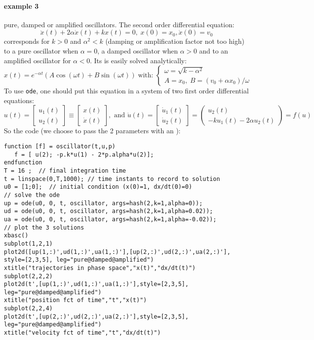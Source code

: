 \begin{examples}
\paragraph{example 3} pure, damped or amplified oscillators. The second order differential
equation:
$$
  \ddot{x}(t) + 2 \alpha \dot{x}(t) + k x(t) = 0, \; x(0)=x_0, \dot{x}(0) = v_0 
$$ 
corresponds for $k > 0$ and $\alpha^2 < k$ (damping or amplification factor not too high) to 
a pure oscillator when $\alpha=0$, a damped oscillator when $\alpha>0$ and to an amplified 
oscillator for $\alpha<0$. Its is easily solved analytically:
$$
  x(t) = e^{-\alpha t}( A \cos(\omega t) + B \sin(\omega t) ) \; \mbox{with: }
\left\{ \begin{array}{l}
\omega = \sqrt{k - \alpha^2} \\
A = x_0, \; B = (v_0 + \alpha x_0)/\omega
\end{array} \right.
$$
To use {\tt ode}, one should put this equation in a system of two first order differential 
equations:
$$
u(t) =  \left[ \begin{array}{c} u_1(t) \\  u_2(t)\end{array} \right]  \equiv  \left[ \begin{array}{c} x(t) \\
    \dot{x}(t)\end{array} \right], \mbox{ and }
\dot{u}(t) =  \left[ \begin{array}{c} \dot{u}_1(t) \\ \dot{u}_2(t) \end{array} \right] =
    \left( \begin{array}{c} u_2(t) \\  -k u_1(t) - 2 \alpha u_2(t) \end{array} \right) = f(u)
$$
So the code (we choose to pass the 2 parameters with an  ):
\begin{Verbatim}
function [f] = oscillator(t,u,p)
   f = [ u(2); -p.k*u(1) - 2*p.alpha*u(2)];
endfunction
T = 16 ;  // final integration time
t = linspace(0,T,1000); // time instants to record to solution
u0 = [1;0];  // initial condition (x(0)=1, dx/dt(0)=0)
// solve the ode
up = ode(u0, 0, t, oscillator, args=hash(2,k=1,alpha=0));
ud = ode(u0, 0, t, oscillator, args=hash(2,k=1,alpha=0.02));
ua = ode(u0, 0, t, oscillator, args=hash(2,k=1,alpha=-0.02));
// plot the 3 solutions
xbasc()
subplot(1,2,1)
plot2d([up(1,:)',ud(1,:)',ua(1,:)'],[up(2,:)',ud(2,:)',ua(2,:)'], style=[2,3,5], leg="pure@damped@amplified")
xtitle("trajectories in phase space","x(t)","dx/dt(t)")
subplot(2,2,2)
plot2d(t',[up(1,:)',ud(1,:)',ua(1,:)'],style=[2,3,5], leg="pure@damped@amplified")
xtitle("position fct of time","t","x(t)")
subplot(2,2,4)
plot2d(t',[up(2,:)',ud(2,:)',ua(2,:)'],style=[2,3,5], leg="pure@damped@amplified")
xtitle("velocity fct of time","t","dx/dt(t)")
\end{Verbatim}
 

\end{examples}
